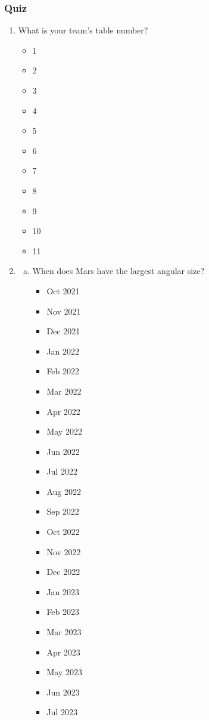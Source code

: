 \documentclass[12pt]{article}
\begin{document}
\subsubsection{Quiz}
\begin{enumerate}
\item
What is your team's table number?
\begin{itemize}
    \item 1
    \item 2
    \item 3
    \item 4
    \item 5
    \item 6
    \item 7
    \item 8
    \item 9
    \item 10
    \item 11
\end{itemize}
\item
\begin{enumerate}[a.]
    \item When does Mars have the largest angular size?
    \begin{itemize}
        \item Oct 2021
        \item Nov 2021
        \item Dec 2021
        \item Jan 2022
        \item Feb 2022
        \item Mar 2022
        \item Apr 2022
        \item May 2022
        \item Jun 2022
        \item Jul 2022
        \item Aug 2022
        \item Sep 2022
        \item Oct 2022
        \item Nov 2022
        \item Dec 2022
        \item Jan 2023
        \item Feb 2023
        \item Mar 2023
        \item Apr 2023
        \item May 2023
        \item Jun 2023
        \item Jul 2023

\end{itemize}
\end{enumerate}
\end{enumerate}
\end{document}

